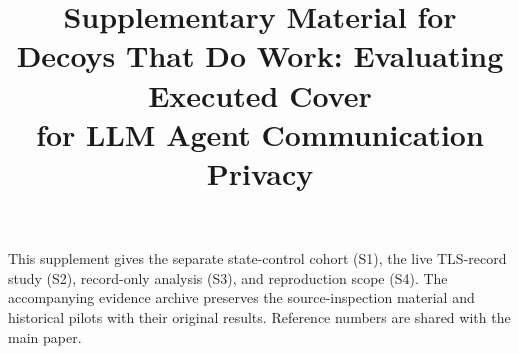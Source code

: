 \documentclass[conference,compsoc]{IEEEtran}
\title{Supplementary Material for\\Decoys That Do Work: Evaluating Executed Cover\\for LLM Agent Communication Privacy}
\author{}
\begin{document}

\raggedbottom
\pagestyle{plain}
\maketitle
\thispagestyle{plain}
\noindent This supplement gives the separate state-control cohort (S1), the live TLS-record study (S2), record-only analysis (S3), and reproduction scope (S4). The accompanying evidence archive preserves the source-inspection material and historical pilots with their original results. Reference numbers are shared with the main paper.

\clearpage
\clearpage
\clearpage


\end{document}
